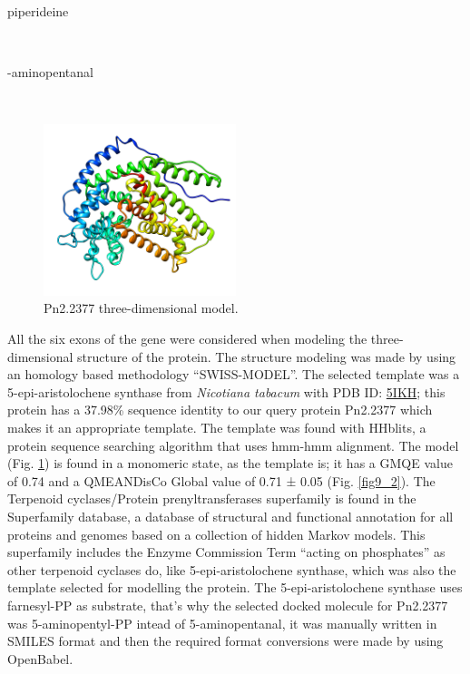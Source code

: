 \documentclass[12pt]{article}
\begin{document}
	\vspace{-45pt}\hspace{0.5\paperwidth-20pt}
	\begin{minipage}{0.345\paperwidth}
		\centering
		piperideine
	\end{minipage}\\
	
	\vspace{-30pt}\hspace{30pt}
	\begin{minipage}{0.345\paperwidth}
		-aminopentanal
	\end{minipage}\\
	
	\FloatBarrier
	\begin{figure}
		\centering
		\includegraphics[width=0.5\textwidth]{../9/Minimize/model2.png}
		\caption{\centering Pn2.2377 three-dimensional model.}
		\label{fig9_1}
	\end{figure}
	\FloatBarrier
	
	All the six exons of the gene were considered when modeling the three-dimensional structure of the protein. The structure modeling was made by using an homology based methodology ``SWISS-MODEL''. \cite{swiss} The selected template was a 5-epi-aristolochene synthase from \textit{Nicotiana tabacum} with PDB ID: \href{https://www.rcsb.org/structure/5IKH}{5IKH}; this protein has a 37.98\% sequence identity to our query protein Pn2.2377 which makes it an appropriate template. The template was found with HHblits, a protein sequence searching algorithm that uses hmm-hmm alignment. \cite{hhblits} The model (Fig. \ref{fig9_1}) is found in a monomeric state, as the template is; it has a GMQE value of 0.74 and a QMEANDisCo Global value of 0.71 ± 0.05 (Fig. \ref{fig9_2}). \cite{qmeandisco_swiss} The Terpenoid cyclases/Protein prenyltransferases superfamily is found in the Superfamily database, a database of structural and functional annotation for all proteins and genomes based on a collection of hidden Markov models. \cite{gough2001assignment, pandurangan2019superfamily} This superfamily includes the Enzyme Commission Term ``acting on phosphates'' as other terpenoid cyclases do, like 5-epi-aristolochene synthase, which was also the template selected for modelling the protein. The 5-epi-aristolochene synthase uses farnesyl-PP as substrate, that's why the selected docked molecule for Pn2.2377 was 5-aminopentyl-PP intead of 5-aminopentanal, it was manually written in SMILES format and then the required format conversions were made by using OpenBabel. \cite{obabel}
	
\end{document}
